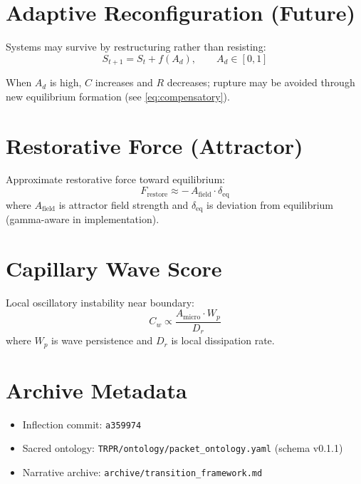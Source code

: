 \documentclass[11pt]{article}
\begin{document}
\section{Adaptive Reconfiguration (Future)}
Systems may survive by restructuring rather than resisting:
\begin{equation}
  S_{t+1} = S_t + f(A_d), \qquad A_d \in [0,1]
  \label{eq:adaptation}
\end{equation}

When $A_d$ is high, $C$ increases and $R$ decreases; rupture may be avoided through new equilibrium formation (see \eqref{eq:compensatory}).

\section{Restorative Force (Attractor)}
Approximate restorative force toward equilibrium:
\begin{equation}
  F_{\mathrm{restore}} \approx -\, A_{\mathrm{field}} \cdot \delta_{\mathrm{eq}}
\end{equation}
where $A_{\mathrm{field}}$ is attractor field strength and $\delta_{\mathrm{eq}}$ is deviation from equilibrium (gamma-aware in implementation).

\section{Capillary Wave Score}
Local oscillatory instability near boundary:
\begin{equation}
  C_w \propto \frac{A_{\mathrm{micro}} \cdot W_p}{D_r}
\end{equation}
where $W_p$ is wave persistence and $D_r$ is local dissipation rate.

\section{Archive Metadata}
\begin{itemize}
  \item Inflection commit: \texttt{a359974}
  \item Sacred ontology: \texttt{TRPR/ontology/packet\_ontology.yaml} (schema v0.1.1)
  \item Narrative archive: \texttt{archive/transition\_framework.md}
\end{itemize}
\end{document}
